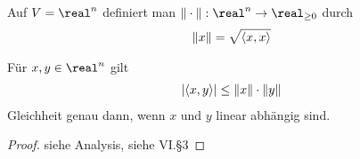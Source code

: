 \begin{definition}
	Auf $V=\real^n$ definiert man  $\Vert \cdot \Vert:\real^n\to \real_{\ge 0}$ durch
	\begin{align}
		\Vert x\Vert =\sqrt{\langle  x,x\rangle}\notag
	\end{align}
\end{definition}

\begin{proposition}
	Für $x,y\in\real^n$ gilt
	\begin{align}
		\vert \langle x,y \rangle\vert \le \Vert x\Vert \cdot \Vert y\Vert\notag
	\end{align}
	Gleichheit genau dann, wenn $x$ und $y$ linear abhängig sind.
\end{proposition}
\begin{proof}
	siehe Analysis, siehe VI.§3
\end{proof}

